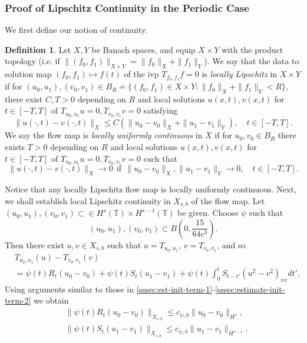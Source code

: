 \documentclass[12pt,reqno]{amsart}
\numberwithin{equation}{section}  %
\numberwithin{figure}{section}
\newcommand{\ci}{\mathbb{T}}
\theoremstyle{plain}
\theoremstyle{definition}
\newtheorem{definition}{Definition}
\theoremstyle{remark}
\begin{document}
\subsubsection{Proof of Lipschitz Continuity in the Periodic Case} 
\label{sssec:lip-continuity}
%
%
We first define our notion of continuity.
%
%
\begin{definition}
  Let $X, Y$ be Banach spaces, and equip $X \times Y$ with the product
  topology (i.e. if $\|(f_0, f_1)\|_{X \times Y} = \|f_0\|_{X} + \|f_1\|_{Y}$).
  We say that the data to solution
  map $(f_0, f_1) \mapsto f(t)$ of the ivp $T_{f_0, f_1} f =
  0$ is \emph{locally Lipschitz} in $X \times Y$ if for
  $(u_0, u_1), (v_0, v_1) \in B_R \doteq \{(f_0,f_1) \in X \times Y: \|f_0\|_{X} +
  \|f_1\|_{Y}< R\},$ there exist $C, T>0$ depending on $R$ and local solutions
  $u(x,t), v(x,t)$
  for $t \in [-T, T]$ of $T_{u_0, u_1}u=0, T_{v_0, v_1}v=0$ satisfying
	$$\|u(\cdot, t) - v(\cdot, t)
  \|_X \le C \left( \|u_{0} - v_0 \|_{X} + \|u_{1} - v_1 \|_{Y}
  \right), \quad t \in [-T, T].$$ We
	say the flow map is \emph{locally uniformly
	continuous} in $X$ if for
	$u_0, v_0 \in B_R$ there exists $T >0$ depending on $R$ and local solutions
  $u(x,t), v(x,t)$
  for $t \in [-T, T]$ of $T_{u_0, u_1}u=0, T_{v_0, v_1}v=0$ such that 
	$$ \|u(\cdot, t) - v(\cdot, t) \|_{X} \to
  0 \ \ \text{if}  \ \ \|u_0 - v_0 \|_{X}, \|u_1 - v_1 \|_{Y} \to 0, \quad
  t \in
  [-T, T]. $$ 
\end{definition}
%
%
Notice that any locally Lipschitz flow map is locally uniformly continuous. 
Next, we shall establish local Lipschitz continuity in $X_{s,b}$ of the flow
map. Let $(u_0, u_1), (v_0, v_1) \subset \in H^{s}(\ci) \times H^{s-1}(\ci)  $
be given. Choose $\psi$ such that $$(u_0, u_1), (v_0, v_1)  \subset B(0,
\frac{15}{64c^{3}}).$$ Then there exist $u, v \in X_{s,b}$ such that $u =
T_{u_0, u_1}$, $v = T_{v_0, v_1}$, and so
%
%
\begin{equation}
	\label{gen-1a}
	\begin{split}
		& T_{u_0, u_1}(u) - T_{v_0, v_1}(v)
		\\
    & = \psi(t ) R_{t}(u_{0} - v_0) + \psi(t) S_{t}(u_{1} - v_1)
    + \psi(t) \int_{0}^{t} S_{t-t'}
    (u^{2} - v^{2} )_{xx} dt'.
		\end{split}
\end{equation}
%
%
Using arguments similar to those in 
\autoref{sssec:est-init-term-1}-\autoref{sssec:estimate-init-term-2}
we obtain
%
%
\begin{equation}
	\label{gen-2a}
	\begin{split}
		& \| \psi(t ) R_t (u_0 - v_0)\|_{X_{s,b}}
		\le c_{\psi, b} \|u_0 -v_0\|_{H^s},
    \\
    & \| \psi(t) S_t (u_1 - v_1)\|_{X_{s,b}}
    \le c_{\psi, b} \|u_1 -v_1\|_{H^{s-1}}.
	\end{split}
\end{equation}
\end{document}
